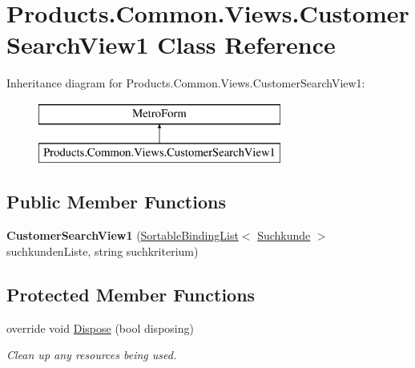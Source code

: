 \hypertarget{class_products_1_1_common_1_1_views_1_1_customer_search_view1}{}\section{Products.\+Common.\+Views.\+Customer\+Search\+View1 Class Reference}
\label{class_products_1_1_common_1_1_views_1_1_customer_search_view1}
Inheritance diagram for Products.\+Common.\+Views.\+Customer\+Search\+View1\+:\begin{figure}[H]
\begin{center}
\leavevmode
\includegraphics[height=2.000000cm]{class_products_1_1_common_1_1_views_1_1_customer_search_view1}
\end{center}
\end{figure}
\subsection*{Public Member Functions}
\begin{DoxyCompactItemize}
\item 
{\bfseries Customer\+Search\+View1} (\hyperlink{class_products_1_1_common_1_1_sortable_binding_list}{Sortable\+Binding\+List}$<$ \hyperlink{class_products_1_1_model_1_1_entities_1_1_suchkunde}{Suchkunde} $>$ suchkunden\+Liste, string suchkriterium)\hypertarget{class_products_1_1_common_1_1_views_1_1_customer_search_view1_a528bece641185a0ec02fa719f5432857}{}\label{class_products_1_1_common_1_1_views_1_1_customer_search_view1_a528bece641185a0ec02fa719f5432857}

\end{DoxyCompactItemize}
\subsection*{Protected Member Functions}
\begin{DoxyCompactItemize}
\item 
override void \hyperlink{class_products_1_1_common_1_1_views_1_1_customer_search_view1_a7c6d0a4a35e5b5915fa5a8b58419e47b}{Dispose} (bool disposing)
\begin{DoxyCompactList}\small\item\em Clean up any resources being used. \end{DoxyCompactList}\end{DoxyCompactItemize}
